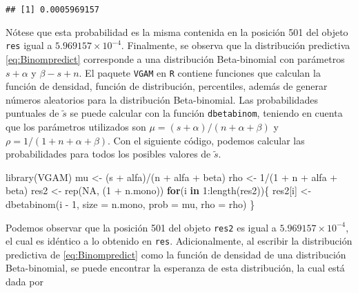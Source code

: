 \documentclass[
  spanish,
]{book}
\newenvironment{Shaded}{\begin{snugshade}}{\end{snugshade}}
\newcommand{\AttributeTok}[1]{\textcolor[rgb]{0.77,0.63,0.00}{#1}}
\newcommand{\ConstantTok}[1]{\textcolor[rgb]{0.00,0.00,0.00}{#1}}
\newcommand{\ControlFlowTok}[1]{\textcolor[rgb]{0.13,0.29,0.53}{\textbf{#1}}}
\newcommand{\DecValTok}[1]{\textcolor[rgb]{0.00,0.00,0.81}{#1}}
\newcommand{\FunctionTok}[1]{\textcolor[rgb]{0.00,0.00,0.00}{#1}}
\newcommand{\NormalTok}[1]{#1}
\newcommand{\OtherTok}[1]{\textcolor[rgb]{0.56,0.35,0.01}{#1}}
\newcommand{\SpecialCharTok}[1]{\textcolor[rgb]{0.00,0.00,0.00}{#1}}
\theoremstyle{definition}
\theoremstyle{definition}
\theoremstyle{definition}
\theoremstyle{definition}
\theoremstyle{remark}
\begin{document}
\begin{verbatim}
## [1] 0.0005969157
\end{verbatim}

Nótese que esta probabilidad es la misma contenida en la posición 501 del objeto \texttt{res} igual a \ensuremath{5.969157\times 10^{-4}}. Finalmente, se observa que la distribución predictiva \eqref{eq:Binompredict} corresponde a una distribución
Beta-binomial con parámetros \(s+\alpha\) y \(\beta-s+n\). El paquete
\texttt{VGAM} \citep{VGAM} en \texttt{R} contiene funciones que calculan la
función de densidad, función de distribución, percentiles, además de
generar números aleatorios para la distribución Beta-binomial. Las
probabilidades puntuales de \(\tilde{s}\) se puede calcular con la función
\texttt{dbetabinom}, teniendo en cuenta que los parámetros utilizados son
\(\mu=(s+\alpha)/(n+\alpha+\beta)\) y \(\rho=1/(1+n+\alpha+\beta)\). Con el
siguiente código, podemos calcular las probabilidades para todos los
posibles valores de \(\tilde{s}\).

\begin{Shaded}
\begin{Highlighting}[]
\FunctionTok{library}\NormalTok{(VGAM) }
\NormalTok{mu }\OtherTok{\textless{}{-}}\NormalTok{ (s }\SpecialCharTok{+}\NormalTok{ alfa)}\SpecialCharTok{/}\NormalTok{(n }\SpecialCharTok{+}\NormalTok{ alfa }\SpecialCharTok{+}\NormalTok{ beta)}
\NormalTok{rho }\OtherTok{\textless{}{-}} \DecValTok{1}\SpecialCharTok{/}\NormalTok{(}\DecValTok{1} \SpecialCharTok{+}\NormalTok{ n }\SpecialCharTok{+}\NormalTok{ alfa }\SpecialCharTok{+}\NormalTok{ beta) }
\NormalTok{res2 }\OtherTok{\textless{}{-}} \FunctionTok{rep}\NormalTok{(}\ConstantTok{NA}\NormalTok{, (}\DecValTok{1} \SpecialCharTok{+}\NormalTok{ n.mono)) }
\ControlFlowTok{for}\NormalTok{(i }\ControlFlowTok{in} \DecValTok{1}\SpecialCharTok{:}\FunctionTok{length}\NormalTok{(res2))\{}
\NormalTok{  res2[i] }\OtherTok{\textless{}{-}} \FunctionTok{dbetabinom}\NormalTok{(i }\SpecialCharTok{{-}} \DecValTok{1}\NormalTok{,}
                        \AttributeTok{size =}\NormalTok{ n.mono,}
                        \AttributeTok{prob =}\NormalTok{ mu,}
                        \AttributeTok{rho =}\NormalTok{ rho)}
\NormalTok{\}}
\end{Highlighting}
\end{Shaded}

Podemos observar que la posición 501 del objeto \texttt{res2} es igual a \ensuremath{5.969157\times 10^{-4}}, el cual es idéntico a lo obtenido en \texttt{res}. Adicionalmente, al escribir la distribución predictiva de
\eqref{eq:Binompredict} como la función de densidad de una distribución
Beta-binomial, se puede encontrar la esperanza de esta distribución, la
cual está dada por
\end{document}

